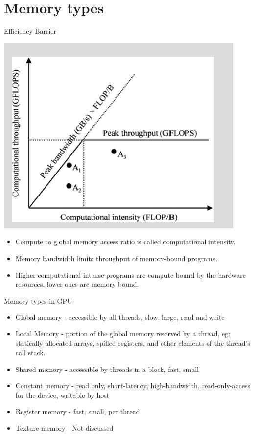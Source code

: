 \documentclass{beamer}
\begin{document}
\section{Memory types}
\begin{frame}{Efficiency Barrier}
    \begin{center}
    \includegraphics[scale = 0.4]{Barrier}
    \end{center}
    \begin{itemize}
    \item Compute to global memory access ratio is called computational intensity.
    \item Memory bandwidth limits throughput of memory-bound programs.
    \item Higher computational intense programs are compute-bound by the hardware resources, lower ones are memory-bound.
    \end{itemize}
\end{frame}
\begin{frame}{Memory types in GPU}
    \begin{itemize}
        \item Global memory - accessible by all threads, slow, large, read and write
        \item Local Memory - portion of the global memory reserved by a thread, eg: statically allocated arrays, spilled registers, and other elements of the
        thread’s call stack.
        \item Shared memory - accessible by threads in a block, fast, small
        \item Constant memory - read only, short-latency, high-bandwidth, read-only-access for the device, writable by host
        \item Register memory - fast, small, per thread
        \item Texture memory - Not discussed
        
    \end{itemize}
    
\end{frame}
\end{document}
